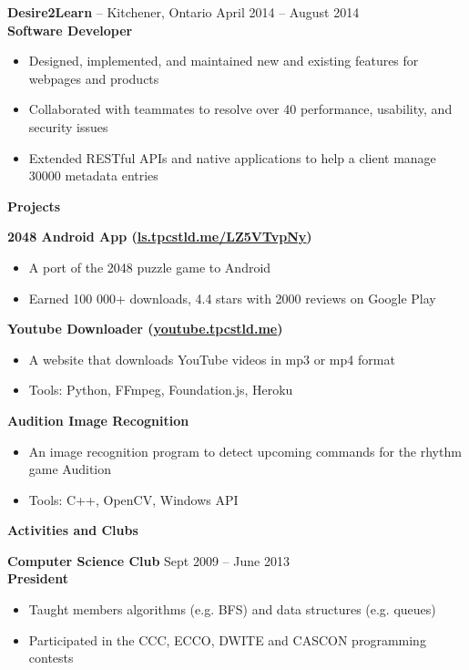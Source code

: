 \documentclass{letter}
\begin{document}
\vspace{-1.5mm}
{\bfseries Desire2Learn} -- Kitchener, Ontario \hfill April 2014 -- August 2014 \\
{\bfseries Software Developer}
\vspace{-3mm}
\begin{itemize}
    \item Designed, implemented, and maintained new and existing features for webpages and products
    \item Collaborated with teammates to resolve over 40 performance, usability, and security issues
    \item Extended RESTful APIs and native applications to help a client manage 30000 metadata entries
\end{itemize}

{\bfseries \Large Projects}

\vspace{-1.5mm}
{\bfseries 2048 Android App (\href{http://ls.tpcstld.me/LZ5YTvpNy}{\uline{ls.tpcstld.me/LZ5VTvpNy}})}
\vspace{-3mm}
\begin{itemize}
    \item A port of the 2048 puzzle game to Android
    \item Earned 100 000+ downloads, 4.4 stars with 2000 reviews on Google Play
\end{itemize}
\vspace{-3mm}
{\bfseries Youtube Downloader (\href{http://youtube.tpcstld.me}{\uline{youtube.tpcstld.me}})}
\vspace{-3mm}
\begin{itemize}
    \item A website that downloads YouTube videos in mp3 or mp4 format
    \item Tools: Python, FFmpeg, Foundation.js, Heroku
\end{itemize}
\vspace{-3mm}
{\bfseries Audition Image Recognition}
\vspace{-3mm}
\begin{itemize}
    \item An image recognition program to detect upcoming commands for the rhythm game Audition
    \item Tools: C++, OpenCV, Windows API
\end{itemize}

{\bfseries \Large Activities and Clubs}

\vspace{-1.5mm}
{\bfseries Computer Science Club} \hfill Sept 2009 -- June 2013 \\
{\bfseries President}
\vspace{-3mm}
\begin{itemize}
  \item Taught members algorithms (e.g. BFS) and data structures (e.g. queues)
  \item Participated in the CCC, ECCO, DWITE and CASCON programming contests
\end{itemize}
\end{document}
